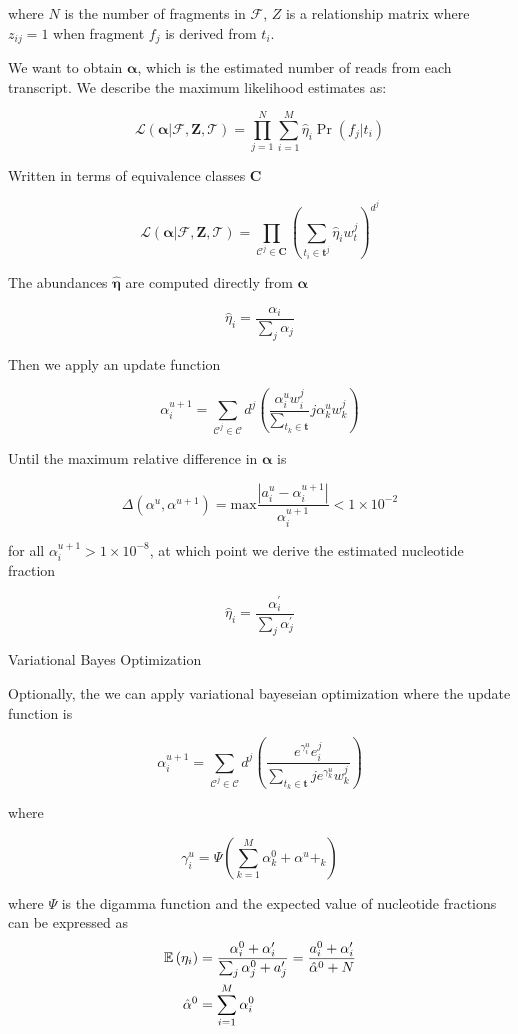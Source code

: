where \(N\) is the number of fragments in \(\mathcal{F}\), \(Z\) is a
relationship matrix where \(z _{ij} =1\) when fragment \(f_j\) is
derived from \(t_i\).

We want to obtain \(\pmb{\alpha}\), which is the estimated number of
reads from each transcript. We describe the maximum likelihood estimates
as:

\[\mathcal{L} \left( \pmb{\alpha} |\mathcal{F}, \pmb{Z},\mathcal{T} \right)  = \prod^{N}_{j=1} \sum^{M}_{i=1} \hat \eta_i \Pr\left(  f_j|t_i\right)\]

Written in terms of equivalence classes \(\pmb{C}\)

\[\mathcal{L} \left( \pmb{\alpha} |\mathcal{F}, \pmb{Z},\mathcal{T} \right)  = \prod^{}_{\mathcal{C}^j \in \pmb{C}} \left( \sum_{t_i \in  \pmb{t}^j} \hat \eta_i w_t^j\right) ^{d^{j}}\]

The abundances \(\pmb{\hat \eta}\) are computed directly from
\(\pmb{\alpha}\)

\[\hat \eta_i= \dfrac{\alpha_i}{\sum_j \alpha_j}\]

Then we apply an update function

\[\alpha_i ^{u+1} = \sum^{}_{\mathcal{C}^j \in \pmb{\mathcal{C}}} d ^{j} \left( \dfrac{\alpha_i^u w_i^j}{\sum^{}_{t_k \in \pmb{t}}} j \alpha^u_k w_k^j\right)\]

Until the maximum relative difference in \( \pmb{\alpha}\) is

\[\Delta \left( \alpha^u, \alpha ^{u+1} \right) = \mathrm{max} \dfrac{\left| a_i^u  - \alpha_i ^{u+1}\right| }{ \alpha_i ^{u+1}} < 1 \times 10 ^{-2}\]

for all \(\alpha_i ^{u+1} > 1 \times 10 ^{-8}\), at which point we
derive the estimated nucleotide fraction

\[\hat \eta_i =\dfrac{\alpha_i ^{\prime} }{ \sum_j \alpha ^{\prime} _j}\]

Variational Bayes Optimization

Optionally, the we can apply variational bayeseian optimization where
the update function is

\[\alpha_i ^{u+1} = \sum^{}_{\mathcal{C}^j \in \pmb{\mathcal{C}}} d ^{j} \left( \dfrac{e ^{ \gamma ^u_i} e_i^j}{\sum^{}_{t_k \in \pmb{t}} j e ^{\gamma ^u _k}w^j_k} \right)\]

where

\[\gamma^u_i = \Psi \left( \sum^{M}_{k=1} \alpha^0_k + \alpha^u+_k \right)\]

where \(\Psi\) is the digamma function and the expected value of
nucleotide fractions can be expressed as
\[
$$
\begin{align*}
	\mathbb{E} \left( \eta_i \right) &= \dfrac{\alpha_i^0 + \alpha_i ^{\prime} }{\sum^{}_{j} \alpha^0_j + a ^{\prime} _j}= \dfrac{a_i^0 + \alpha_i ^{\prime} }{\hat \alpha^0 +N}\\
	\hat \alpha^0 &= \sum^{M}_{i = 1} \alpha_i^0
\end{align*}
$$
\]